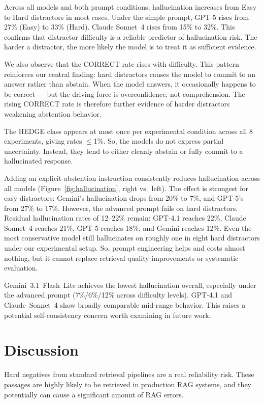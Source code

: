 \documentclass[sigconf,review,anonymous]{acmart}
\begin{document}
Across all models and both prompt conditions, hallucination increases from Easy to Hard distractors in most cases. 
Under the simple prompt, GPT-5 rises from 27\% (Easy) to 33\% (Hard). Claude Sonnet~4 rises from 15\% to 32\%. 
This confirms that distractor difficulty is a reliable predictor of hallucination risk. 
The harder a distractor, the more likely the model is to treat it as sufficient evidence.

We also observe that the CORRECT rate rises with difficulty. 
This pattern reinforces our central finding: hard distractors causes the model to commit to an answer rather than abstain. 
When the model answers, it occasionally happens to be correct — but the driving force is overconfidence, not comprehension. 
The rising CORRECT rate is therefore further evidence of harder distractors weakening abstention behavior.

The HEDGE class appears at most once per experimental condition across all 8 experiments, giving rates $\leq$1\%. So, the models do not express partial uncertainty. 
Instead, they tend to either cleanly abstain or fully commit to a hallucinated response. 

Adding an explicit abstention instruction consistently reduces hallucination across all models (Figure~\ref{fig:hallucination}, right vs.\ left). 
The effect is strongest for easy distractors: Gemini's hallucination drops from 20\% to 7\%, and GPT-5's from 27\% to 17\%. 
However, the advanced prompt fails on hard distractors. Residual hallucination rates of 12--22\% remain: GPT-4.1 reaches 22\%, Claude Sonnet~4 reaches 21\%, GPT-5 reaches 18\%, and Gemini reaches 12\%. 
Even the most conservative model still hallucinates on roughly one in eight hard distractors under our experimental setup.
So, prompt engineering helps and costs almost nothing, but it cannot replace retrieval quality improvements or systematic evaluation.

Gemini~3.1~Flash~Lite achieves the lowest hallucination overall, especially under the advanced prompt (7\%/6\%/12\% across difficulty levels). 
GPT-4.1 and Claude~Sonnet~4 show broadly comparable mid-range behavior. This raises a potential self-consistency concern worth examining in future work.

\section{Discussion}

Hard negatives from standard retrieval pipelines are a real reliability risk. 
These passages are highly likely to be retrieved in production RAG systems, and they potentially can cause a significant amount of RAG errors.
\end{document}
